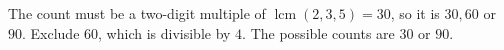The count must be a two-digit multiple of $\operatorname{lcm}(2,3,5)=30$, so it is $30,60$ or $90$. Exclude $60$, which is divisible by $4$. The possible counts are $\boxed{30\text{ or }90}$.
